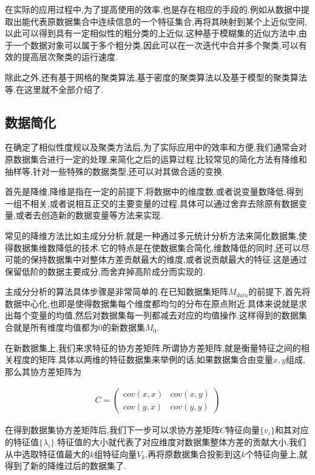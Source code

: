 在实际的应用过程中,为了提高使用的效率,也是存在相应的手段的.例如从数据中提取出能代表原数据集合中连续信息的一个特征集合,再将其映射到某个上近似空间,以此可以得到具有一定相似性的粗分类的上近似\cite{kumar2007rough}.这种基于模糊集的近似方法中,由于一个数据对象可以属于多个粗分类,因此可以在一次迭代中合并多个聚类,可以有效的提高层次聚类的运行速度.

除此之外,还有基于网格的聚类算法,基于密度的聚类算法以及基于模型的聚类算法等.在这里就不全部介绍了.

\subsection{数据简化}\label{sec:data-reduce}

在确定了相似性度规以及聚类方法后,为了实际应用中的效率和方便,我们通常会对原数据集合进行一定的处理,来简化之后的运算过程.比较常见的简化方法有降维和抽样等,针对一些特殊的数据类型,还可以对其做合适的变换.

首先是降维,降维是指在一定的前提下,将数据中的维度数,或者说变量数降低,得到一组不相关,或者说相互正交的主要变量的过程.具体可以通过舍弃去除原有数据变量,或者去创造新的数据变量等方法来实现.

常见的降维方法比如主成分分析,就是一种通过多元统计分析方法来简化数据集,使得数据集维数降低的技术.它的特点是在使数据集合简化,维数降低的同时,还可以尽可能的保持数据集中对整体方差贡献最大的维度,或者说贡献最大的特征.这是通过保留低阶的数据主要成分,而舍弃掉高阶成分而实现的.

主成分分析的算法具体步骤是非常简单的.在已知数据集矩阵$M_{data}$的前提下,首先将数据中心化,也即是使得数据集每个维度都均匀的分布在原点附近.具体来说就是求出每个变量的均值,然后对数据集每一列都减去对应的均值操作.这样得到的数据集合就是所有维度均值都为0的新数据集$M_0$.

在新数据集上,我们来求特征的协方差矩阵.所谓协方差矩阵,就是衡量特征之间的相关程度的矩阵.具体以两维的特征数据集来举例的话,如果数据集合由变量$x,y$组成,那么其协方差矩阵为

\begin{eqnarray}
	C = \left(
			\begin{array}{cc}
				cov(x,x) & cov(x,y)\\
				cov(y,x) & cov(y,y)
			\end{array}
		\right)
\end{eqnarray}

在得到数据集协方差矩阵后,我们下一步可以求协方差矩阵$C$特征向量$\{v_i\}$和其对应的特征值$\{\lambda_i\}$.特征值的大小就代表了对应维度对数据集整体方差的贡献大小,我们从中选取特征值最大的$k$组特征向量$V_k$,再将原数据集合投影到这$k$个特征向量上,就得到了新的降维过后的数据集了.

